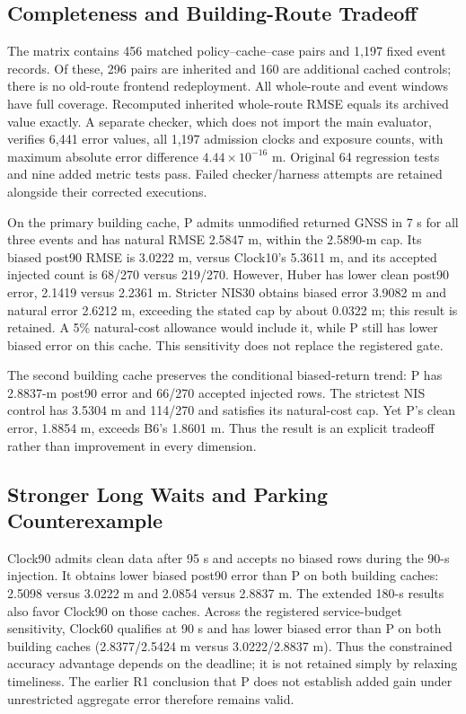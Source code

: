 \documentclass[conference]{IEEEtran}
\begin{document}
\subsection{Completeness and Building-Route Tradeoff}
The matrix contains 456 matched policy--cache--case pairs and 1,197 fixed event records. Of these, 296 pairs are inherited and 160 are additional cached controls; there is no old-route frontend redeployment. All whole-route and event windows have full coverage. Recomputed inherited whole-route RMSE equals its archived value exactly. A separate checker, which does not import the main evaluator, verifies 6,441 error values, all 1,197 admission clocks and exposure counts, with maximum absolute error difference $4.44\times10^{-16}$ m. Original 64 regression tests and nine added metric tests pass. Failed checker/harness attempts are retained alongside their corrected executions.

On the primary building cache, P admits unmodified returned GNSS in 7 s for all three events and has natural RMSE 2.5847 m, within the 2.5890-m cap. Its biased post90 RMSE is 3.0222 m, versus Clock10's 5.3611 m, and its accepted injected count is 68/270 versus 219/270. However, Huber has lower clean post90 error, 2.1419 versus 2.2361 m. Stricter NIS30 obtains biased error 3.9082 m and natural error 2.6212 m, exceeding the stated cap by about 0.0322 m; this result is retained. A 5\% natural-cost allowance would include it, while P still has lower biased error on this cache. This sensitivity does not replace the registered gate.

The second building cache preserves the conditional biased-return trend: P has 2.8837-m post90 error and 66/270 accepted injected rows. The strictest NIS control has 3.5304 m and 114/270 and satisfies its natural-cost cap. Yet P's clean error, 1.8854 m, exceeds B6's 1.8601 m. Thus the result is an explicit tradeoff rather than improvement in every dimension.

\subsection{Stronger Long Waits and Parking Counterexample}
Clock90 admits clean data after 95 s and accepts no biased rows during the 90-s injection. It obtains lower biased post90 error than P on both building caches: 2.5098 versus 3.0222 m and 2.0854 versus 2.8837 m. The extended 180-s results also favor Clock90 on those caches. Across the registered service-budget sensitivity, Clock60 qualifies at 90 s and has lower biased error than P on both building caches (2.8377/2.5424 m versus 3.0222/2.8837 m). Thus the constrained accuracy advantage depends on the deadline; it is not retained simply by relaxing timeliness. The earlier R1 conclusion that P does not establish added gain under unrestricted aggregate error therefore remains valid.
\end{document}
